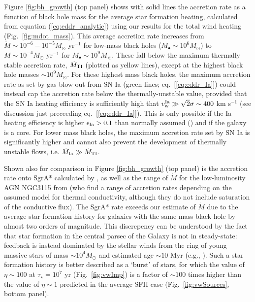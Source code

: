 \documentclass[usenatbib,fleqn]{mn2e}
\begin{document}
Figure \ref{fig:bh_growth} (top panel) shows with solid lines the
accretion rate as a function of black hole mass for the average star
formation heating, calculated from equation (\ref{eq:eddr_analytic})
using our results for the total wind heating
(Fig.~\ref{fig:mdot_mass}).  This average accretion rate increases
from $\dot{M} \sim 10^{-6}-10^{-5}M_{\odot}$ yr$^{-1}$ for low-mass
black holes ($M_{\bullet} \sim 10^{6}M_{\odot}$) to $\dot{M} \sim
10^{-4}M_{\odot}$ yr$^{-1}$ for $M_{\bullet} \sim 10^{9}M_{\sun}$.
These fall below the maximum thermally stable accretion rate,
$\dot{M}_{\rm TI}$ (plotted as yellow lines), except at the highest
black hole masses $\sim 10^{9}M_{\odot}$.  For these highest mass
black holes, the maximum accretion rate as set by gas blow-out from SN
Ia (green lines; eq.~[\ref{eq:eddr_Ia}]) could instead cap the
accretion rate below the thermally-unstable value, provided that the
SN Ia heating efficiency is sufficiently high that $v_{\rm w}^{\rm Ia}
\gg \sqrt{2}\sigma \sim 400$ km s$^{-1}$ (see discussion just
preceeding eq.~[\ref{eq:eddr_Ia}]).  This is only possible if the Ia
heating efficiency is higher $\epsilon_{\rm Ia} > 0.1$ than normally
assumed (\citealt{Sharma+14}) and if the galaxy is a core.  For lower mass black holes, the
maximum accretion rate set by SN Ia is significantly higher and cannot
also prevent the development of thermally unstable flows,
i.e. $\dot{M}_{\rm Ia} \gg \dot{M}_{\rm TI}$.

Shown also for comparison in Figure \ref{fig:bh_growth} (top panel) is the accretion rate onto SgrA* calculated by \citet{Quataert:2004a}, as well as the range of $\dot{M}$ for the low-luminosity AGN NGC3115 from \citealt{ShcherbakovWong+:2014a} (who find a range of accretion rates depending on the assumed model for thermal conductivity, although they do not include saturation of the conductive flux).  The SgrA* rate exceeds our estimate of $\dot{M}$ due to the average star formation history for galaxies with the same mass black hole by almost two orders of magnitude.  This discrepency can be understood by the fact that star formation in the central parsec of the Galaxy is not in steady-state: feedback is instead dominated by the stellar winds from the ring of young massive stars of mass $\sim 10^{4}M_{\odot}$ and estimated age $\sim 10$ Myr (e.g., \citealt{Schodel+07}).  Such a star formation history is better described as a `burst' of stars, for which the value of $\eta \sim 100$ at $\tau_{\star} = 10^{7}$ yr (Fig.~\ref{fig:vwImp}) is a factor of $\sim 100$ times higher than the value of $\eta \sim 1$ predicted in the average SFH case (Fig.~\ref{fig:vwSources}, bottom panel).
\end{document}
